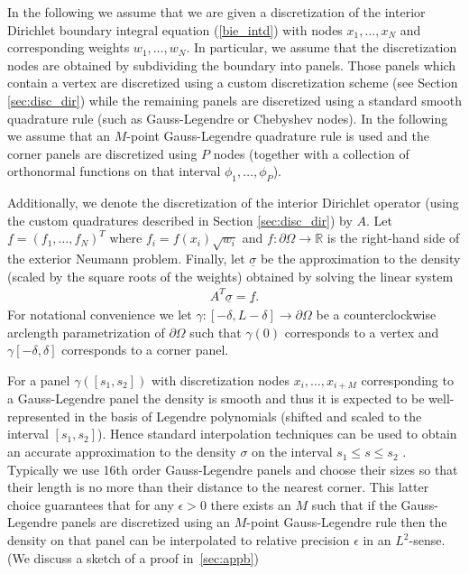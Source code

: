 In the following we assume that we are given a discretization of the interior Dirichlet boundary integral equation (\ref{bie_intd}) with nodes $x_1,\dots,x_N$ and corresponding weights $w_1,\dots,w_N.$ In particular, we assume that the discretization nodes are obtained by subdividing the boundary into panels. Those panels which contain a vertex are discretized using a custom discretization scheme (see Section \ref{sec:disc_dir}) while the remaining panels are discretized using a standard smooth quadrature rule (such as Gauss-Legendre or Chebyshev nodes). In the following we assume that an $M$-point Gauss-Legendre quadrature rule is used and the corner panels are discretized using $P$ nodes (together with a collection of orthonormal functions on that interval $\phi_1,\dots,\phi_P$).

Additionally, we denote the discretization of the interior Dirichlet operator (using the custom quadratures described in Section \ref{sec:disc_dir}) by $A.$ Let $\underline{f} = (f_1,\dots,f_N)^T$ where $f_i = f(x_i) \sqrt{w_i}$ and $f: \partial \Omega \to \mathbb{R}$ is the right-hand side of the exterior Neumann problem. Finally, let $\underline{\sigma}$ be the approximation to the density (scaled by the square roots of the weights) obtained by solving the linear system
\begin{align}\label{eqn:adj_linalg}
A^T \underline{\sigma} = \underline{f}.
\end{align}
For notational convenience we let $\gamma:[-\delta,L-\delta] \to \partial \Omega$ be a counterclockwise arclength parametrization of $\partial \Omega$ such that  $\gamma(0)$ corresponds to a vertex and $\gamma[-\delta,\delta]$ corresponds to a corner panel.

For a panel $\gamma([s_1,s_2])$ with discretization nodes $x_i,\dots,x_{i+M}$ corresponding to a Gauss-Legendre panel the density is smooth and thus it is expected to be well-represented in the basis of Legendre polynomials (shifted and scaled to the interval $[s_1,s_2]$). Hence standard interpolation techniques can be used to obtain an accurate approximation to the density $\sigma$ on the interval $s_1 \le s\le s_2$ . Typically we use 16th order Gauss-Legendre panels and choose their sizes so that their length is no more than their distance to the nearest corner. This latter choice guarantees that for any $\epsilon>0$ there exists an $M$ such that if the Gauss-Legendre panels are discretized using an $M$-point Gauss-Legendre rule then the density on that panel can be interpolated to relative precision $\epsilon$ in an $L^2$-sense.
(We discuss a sketch of a proof in~\cref{sec:appb})


